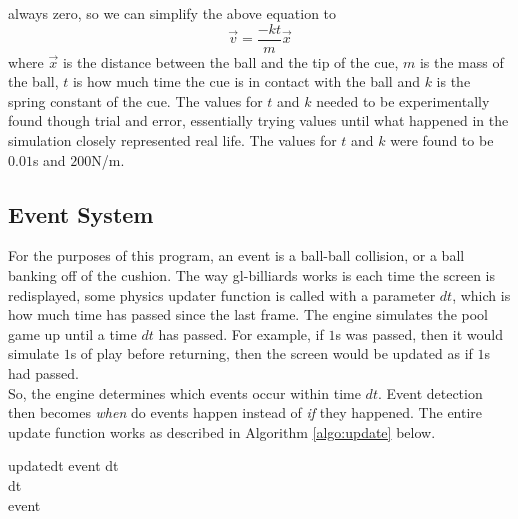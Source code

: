     always zero, so we can simplify the above equation to
    \begin{equation}
        \vec v = \frac{-k t}{m}\vec x
        \label{equ:shot_velocity}
    \end{equation}
    where $\vec x$ is the distance between the ball and the tip of the cue, $m$ is the mass of the ball, $t$ is how much time the
    cue is in contact with the ball and $k$ is the spring constant of the cue. The values for $t$ and $k$ needed to be experimentally
    found though trial and error, essentially trying values until what happened in the simulation closely represented real life. The
    values for $t$ and $k$ were found to be $0.01$s and $200$N/m.
    
    \subsection{Event System}
    For the purposes of this program, an event is a ball-ball collision, or a ball banking off of the cushion. The way gl-billiards works
    is each time the screen is redisplayed, some physics updater function is called with a parameter $dt$, which is how much time has passed
    since the last frame. The engine simulates the pool game up until a time $dt$ has passed. For example, if $1$s was passed, then it would
    simulate $1$s of play before returning, then the screen would be updated as if $1$s had passed.
    \\
    So, the engine determines which events occur within time $dt$. Event detection then becomes \textit{when} do events happen instead
    of \textit{if} they happened. The entire update function works as described in Algorithm \ref{algo:update} below. \\
    \begin{center}
    \begin{pseudocode}[framebox]{update}{dt}
        event \gets {} dt     \\
        \IF {}
        \THEN {} dt                                 \\
        \ELSE \BEGIN
             event               \\
                              \\
        \END
        \label{algo:update}
    \end{pseudocode}
    \end{center}

